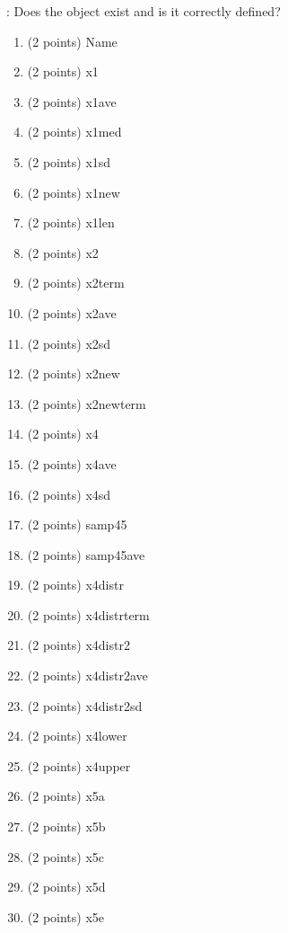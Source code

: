 \documentclass{article}
\begin{document}
\pagestyle{myheadings}

\begin{center}
\textbf{}
\end{center}

\renewcommand{\labelenumi}{\underbar{\hspace{1cm}}\theenumi.}
\renewcommand{\labelenumii}{\underbar{\hspace{1cm}}\theenumii.}

: Does the object exist and is it correctly defined?

\begin{multicols}{2}
\begin{enumerate}
\item (2 points) Name
\item (2 points) x1
\item (2 points) x1ave
\item (2 points) x1med
\item (2 points) x1sd
\item (2 points) x1new
\item (2 points) x1len
\item (2 points) x2
\item (2 points) x2term
\item (2 points) x2ave
\item (2 points) x2sd
\item (2 points) x2new
\item (2 points) x2newterm
\item (2 points) x4
\item (2 points) x4ave
\item (2 points) x4sd
\item (2 points) samp45
\item (2 points) samp45ave
\item (2 points) x4distr
\item (2 points) x4distrterm
\item (2 points) x4distr2
\item (2 points) x4distr2ave
\item (2 points) x4distr2sd
\item (2 points) x4lower
\item (2 points) x4upper
\item (2 points) x5a
\item (2 points) x5b
\item (2 points) x5c
\item (2 points) x5d
\item (2 points) x5e
\end{enumerate}
\end{multicols}
\end{document}
